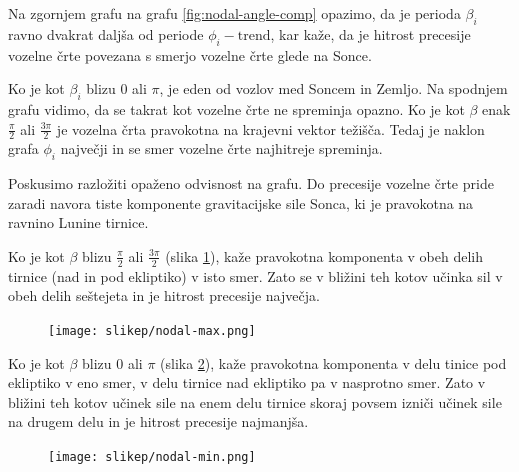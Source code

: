 \documentclass[a4paper,12pt]{article}
\begin{document}
\noindent
Na zgornjem grafu na grafu \ref{fig:nodal-angle-comp} opazimo, da je perioda 
$\beta_i$ ravno dvakrat daljša od periode $\phi_i-\mathrm{trend}$, kar kaže, da
je hitrost precesije vozelne črte povezana s smerjo vozelne črte glede na Sonce.

Ko je kot $\beta_i$ blizu $0$ ali $\pi$, je 
eden od vozlov med Soncem in Zemljo. Na spodnjem grafu vidimo, da se takrat kot 
vozelne črte ne spreminja opazno. Ko je kot $\beta$ enak $\frac{\pi}{2}$ ali 
$\frac{3\pi}{2}$ je vozelna črta pravokotna na krajevni vektor težišča. Tedaj 
je naklon grafa $\phi_i$ največji in se smer vozelne črte najhitreje spreminja. 

Poskusimo razložiti opaženo odvisnost na grafu. Do precesije vozelne črte pride 
zaradi navora tiste komponente gravitacijske sile Sonca, ki je pravokotna na 
ravnino Lunine tirnice. 

Ko je kot $\beta$ blizu $\frac{\pi}{2}$ ali $\frac{3\pi}{2}$ (slika 
\ref{fig:sile-nodal-iste}), kaže pravokotna komponenta v obeh delih tirnice 
(nad in pod ekliptiko) v isto smer. Zato se v bližini teh kotov učinka sil v 
obeh delih seštejeta in je hitrost precesije največja.

\renewcommand{\figurename}{Slika}

\begin{figure}[h!]
    \centering
    \texttt{[image: slikep/nodal-max.png]}
    \label{fig:sile-nodal-iste}
\end{figure}

\newpage

\noindent
Ko je kot $\beta$ blizu $0$ ali $\pi$ (slika \ref{fig:sile-nodal-razlicne}), 
kaže pravokotna komponenta v delu tinice pod ekliptiko v eno smer, v delu 
tirnice nad ekliptiko pa v nasprotno smer. Zato v bližini teh kotov učinek 
sile na enem delu tirnice skoraj povsem izniči učinek sile na drugem delu in je 
hitrost precesije najmanjša.

\begin{figure}[h!]
    \centering
    \texttt{[image: slikep/nodal-min.png]}
    \label{fig:sile-nodal-razlicne}
\end{figure}
\end{document}
